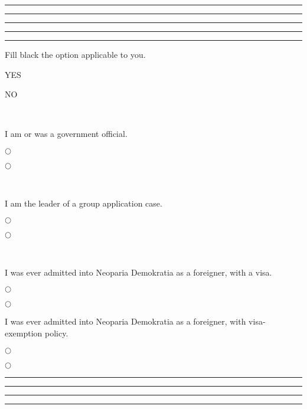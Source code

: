 \formbrickcontentheight=27pt

\par\hrule
\formbrickVlineLeft%
\formbrickVlineMid%
\formbrickVlineMid%
\formbrickVlineRight%
\par\hrule
\formbrickVlineLeft%
\formbrickVlineMid%
\formbrickVlineMid%
\formbrickVlineRight%
\par\hrule
{}%
\par\hrule
\vskip 5pt

\par\hrule
\formbrickVlineLeft%
\parbox{\linewidth-6pt}{
    \leavevmode\vskip 1pt
	\sffamily
	\parbox{\linewidth-12em}{Fill black the option applicable to you.}\hfill\parbox{3em}{YES}\parbox{3em}{NO}\\
	\parbox{\linewidth-12em}{\formfieldlead\sffamily I am or was a government official.}\hfill\parbox{3em}{$\bigcirc$}\parbox{3em}{$\bigcirc$}\\
	\parbox{\linewidth-12em}{\formfieldlead\sffamily I am the leader of a group application case.}\hfill\parbox{3em}{$\bigcirc$}\parbox{3em}{$\bigcirc$}\\
	\parbox{\linewidth-12em}{\formfieldlead\sffamily I was ever admitted into Neoparia Demokratia as a foreigner, with a visa.}\hfill\parbox{3em}{$\bigcirc$}\parbox{3em}{$\bigcirc$}
	\parbox{\linewidth-12em}{\formfieldlead\sffamily I was ever admitted into Neoparia Demokratia as a foreigner, with visa-exemption policy.}\hfill\parbox{3em}{$\bigcirc$}\parbox{3em}{$\bigcirc$}
\vskip 4pt}\formbrickVlineRight%
\par\hrule
\vskip 5pt

\par\hrule
\formbrickVlineLeft%
\formbrickVlineMid%
\formbrickVlineMid%
\formbrickVlineRight%
\par\hrule
{}%
\par\hrule
\vskip 5pt


